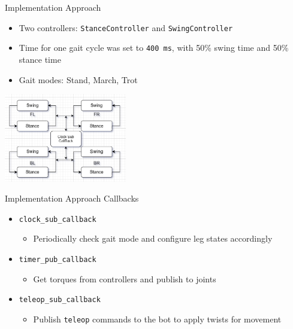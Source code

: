 \documentclass{beamer}
\begin{document}
\begin{frame}{Implementation Approach}
\begin{itemize}
    \item Two controllers: \texttt{StanceController} and \texttt{SwingController}
    \item Time for one gait cycle was set to \texttt{400 ms}, with 50\% swing time and 50\% stance time
    \item Gait modes: Stand, March, Trot
\end{itemize}
\begin{center}
        \includegraphics[width=0.4\textwidth]{Presentation-4/images/clock_sub_callback.png}
\end{center}
\end{frame}\normalfont

\begin{frame}{Implementation Approach}
Callbacks
\begin{itemize}
    \item \texttt{clock\_sub\_callback}
    \begin{itemize}
        \item Periodically check gait mode and configure leg states accordingly
    \end{itemize}
    
    \item \texttt{timer\_pub\_callback}
    \begin{itemize}
        \item Get torques from controllers and publish to joints
    \end{itemize}

    \item \texttt{teleop\_sub\_callback}
    \begin{itemize}
        \item Publish \texttt{teleop} commands to the bot to apply twists for movement
    \end{itemize}
\end{itemize}
\end{frame}\normalfont
\end{document}
